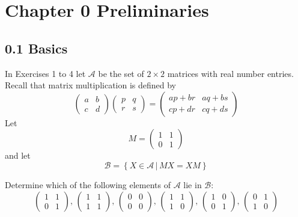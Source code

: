 \documentclass[12pt]{article}
\newenvironment{problem}[2][Exercise]{\begin{trivlist}
\item[\hskip \labelsep {\bfseries #1}\hskip \labelsep {\bfseries #2.}]}{\end{trivlist}}
\begin{document}

\rhead{\today}



\section*{Chapter 0 Preliminaries}

\subsection*{0.1 Basics}
In Exercises 1 to 4 let $\mathcal{A}$ be the set of $2\times2$ matrices with real number entries. Recall that matrix multiplication is defined by
$$ \left( \begin{array}{cc} a & b \\ c & d \end{array} \right) \left( \begin{array}{cc} p & q \\ r & s \end{array}\right) = \left( \begin{array}{cc} ap+br & aq+bs \\ cp+dr & cq+ds \end{array}\right) $$ Let $$ M = \left( \begin{array}{cc} 1 & 1 \\ 0 & 1 \end{array}\right)$$
and let
$$ \mathcal{B} = \left\{ X\in \mathcal{A} \, | \, MX=XM \right\} $$

\begin{problem}{0.1}
Determine which of the following elements of $\mathcal{A}$ lie in $\mathcal{B}$:
$$ \left( \begin{array}{cc} 1 & 1 \\ 0 & 1 \end{array}\right), \, \left( \begin{array}{cc} 1 & 1 \\ 1 & 1 \end{array}\right), \, \left( \begin{array}{cc} 0 & 0 \\ 0 & 0 \end{array}\right), \, \left( \begin{array}{cc} 1 & 1 \\ 1 & 0 \end{array}\right), \, \left( \begin{array}{cc} 1 & 0 \\ 0 & 1 \end{array}\right), \, \left( \begin{array}{cc} 0 & 1 \\ 1 & 0 \end{array}\right) $$
\end{problem}
\end{document}
